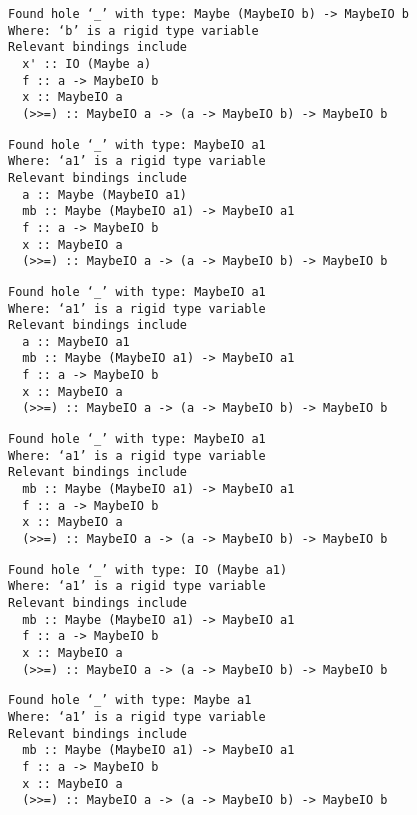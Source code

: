 \documentclass{beamer}
\begin{document}
\begin{frame}[fragile]
\begin{overprint}
\begin{verbatim}
\end{verbatim}
\begin{verbatim}
Found hole ‘_’ with type: Maybe (MaybeIO b) -> MaybeIO b
Where: ‘b’ is a rigid type variable
Relevant bindings include
  x' :: IO (Maybe a)
  f :: a -> MaybeIO b
  x :: MaybeIO a
  (>>=) :: MaybeIO a -> (a -> MaybeIO b) -> MaybeIO b
\end{verbatim}
\begin{verbatim}
Found hole ‘_’ with type: MaybeIO a1
Where: ‘a1’ is a rigid type variable
Relevant bindings include
  a :: Maybe (MaybeIO a1)
  mb :: Maybe (MaybeIO a1) -> MaybeIO a1
  f :: a -> MaybeIO b
  x :: MaybeIO a
  (>>=) :: MaybeIO a -> (a -> MaybeIO b) -> MaybeIO b
\end{verbatim}
\begin{verbatim}
Found hole ‘_’ with type: MaybeIO a1
Where: ‘a1’ is a rigid type variable
Relevant bindings include
  a :: MaybeIO a1
  mb :: Maybe (MaybeIO a1) -> MaybeIO a1
  f :: a -> MaybeIO b
  x :: MaybeIO a
  (>>=) :: MaybeIO a -> (a -> MaybeIO b) -> MaybeIO b
\end{verbatim}
\begin{verbatim}
Found hole ‘_’ with type: MaybeIO a1
Where: ‘a1’ is a rigid type variable
Relevant bindings include
  mb :: Maybe (MaybeIO a1) -> MaybeIO a1
  f :: a -> MaybeIO b
  x :: MaybeIO a
  (>>=) :: MaybeIO a -> (a -> MaybeIO b) -> MaybeIO b
\end{verbatim}
\begin{verbatim}
Found hole ‘_’ with type: IO (Maybe a1)
Where: ‘a1’ is a rigid type variable
Relevant bindings include
  mb :: Maybe (MaybeIO a1) -> MaybeIO a1
  f :: a -> MaybeIO b
  x :: MaybeIO a
  (>>=) :: MaybeIO a -> (a -> MaybeIO b) -> MaybeIO b
\end{verbatim}
\begin{verbatim}
Found hole ‘_’ with type: Maybe a1
Where: ‘a1’ is a rigid type variable
Relevant bindings include
  mb :: Maybe (MaybeIO a1) -> MaybeIO a1
  f :: a -> MaybeIO b
  x :: MaybeIO a
  (>>=) :: MaybeIO a -> (a -> MaybeIO b) -> MaybeIO b
\end{verbatim}
\end{overprint}
\end{frame}
\end{document}
